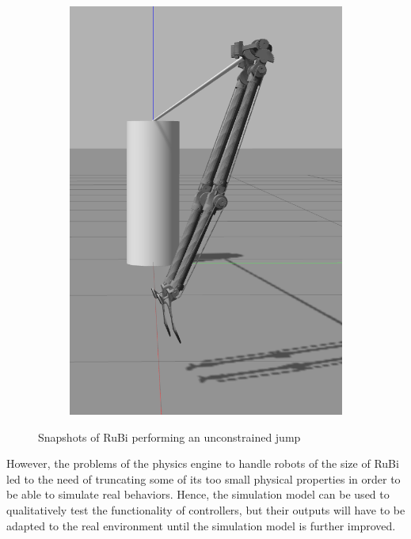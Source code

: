 \begin{figure}[ht!]
\begin{subfigure}[b]{0.16\textwidth}
        \includegraphics[width=\textwidth]{figures/gazebo_jumping_7}
    \end{subfigure}
    \caption{Snapshots of RuBi performing an unconstrained jump}
    \label{fig:RuBi_jump_sequence}
\end{figure}      

However, the problems of the physics engine to handle robots of the size of RuBi led to the need of truncating some of its too small physical properties in order to be able to simulate real behaviors.
Hence, the simulation model can be used to qualitatively test the functionality of controllers, but their outputs will have to be adapted to the real environment until the simulation model is further improved.

